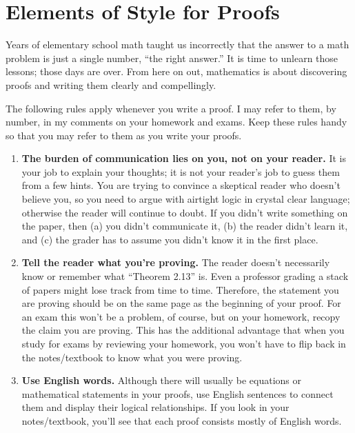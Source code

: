\documentclass[11pt]{article}
\begin{document}
\section*{Elements of Style for Proofs}

Years of elementary school math taught us incorrectly that the answer to a math problem is just a single number, ``the right answer.''  It is time to unlearn those lessons; those days are over.  From here on out, mathematics is about discovering proofs and writing them clearly and compellingly.

The following rules apply whenever you write a proof.  I may refer to them, by number, in my comments on your homework and exams.  Keep these rules handy so that you may refer to them as you write your proofs.

\begin{enumerate}

\item \textbf{The burden of communication lies on you, not on your reader.}
        It is your job to explain your thoughts;
        it is not your reader's job to guess them from a few hints.
        You are trying to convince a skeptical reader who doesn't believe you,
        so you need to argue with airtight logic in crystal clear language;
        otherwise the reader will continue to doubt.
        If you didn't write something on the paper, then
          (a) you didn't communicate it,
          (b) the reader didn't learn it, and
          (c) the grader has to assume you didn't know it in the first place.
          
\item \textbf{Tell the reader what you're proving.}
        The reader doesn't necessarily know or remember what ``Theorem 2.13'' is.
        Even a professor grading a stack of papers might lose track from time to time.
        Therefore, the statement you are proving should be on the same page as the beginning of your proof.
        For an exam this won't be a problem, of course,
        but on your homework, recopy the claim you are proving.
        This has the additional advantage that when you study for exams by reviewing your homework,
        you won't have to flip back in the notes/textbook to know what you were proving.

\item \textbf{Use English words.}
        Although there will usually be equations or mathematical statements in your proofs,
        use English sentences to connect them and display their logical relationships.
        If you look in your notes/textbook, you'll see that each proof consists mostly of English words.


\end{enumerate}
\end{document}
